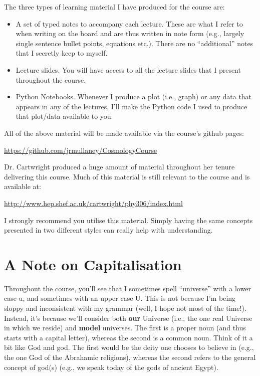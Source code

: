 \documentclass[11pt]{article}
\begin{document}
    The three types of learning material I have produced for the course are:
    \begin{itemize}
    \item A set of typed notes to accompany each lecture. These are what I refer to when writing on the board and are thus written in note form (e.g., largely single sentence bullet points, equations etc.). There are no ``additional'' notes that I secretly keep to myself.
    \item Lecture slides. You will have access to all the lecture slides that I present throughout the course.
    \item Python Notebooks. Whenever I produce a plot (i.e., graph) or any data that appears in any of the lectures, I'll make the Python code I used to produce that plot/data available to you.

    \end{itemize}

    \noindent
    All of the above material will be made available via the course's github pages:

    \noindent
    \url{https://github.com/jrmullaney/CosmologyCourse}
    
    Dr. Cartwright produced a huge amount of material throughout her tenure delivering this course. Much of this material is still relevant to the course and is available at:
    
    \noindent
    \url{http://www.hep.shef.ac.uk/cartwright/phy306/index.html}
    
    \noindent
    I strongly recommend you utilise this material. Simply having the same concepts presented in two different styles can really help with understanding.
    
    \section{A Note on Capitalisation}
   Throughout the course, you'll see that I sometimes spell ``universe'' with a lower case u, and sometimes with an upper case U. This is not because I'm being sloppy and inconsistent with my grammar (well, I hope not most of the time!). Instead, it's because we'll consider both {\bf our} Universe (i.e., the one real Universe in which we reside) and {\bf model} universes. The first is a proper noun (and thus starts with a capital letter), whereas the second is a common noun. Think of it a bit like God and god. The first would be the deity one chooses to believe in (e.g., the one God of the Abrahamic religions), whereas the second refers to the general concept of god(s) (e.g., we speak today of the gods of ancient Egypt).
    
    
\end{document}
